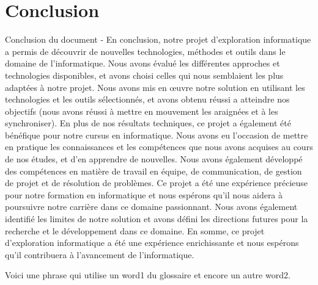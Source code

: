	\chapter{Conclusion}

Conclusion du document - En conclusion, notre projet d'exploration informatique a permis de découvrir de nouvelles technologies, 
méthodes et outils dans le domaine de l'informatique. Nous avons évalué les différentes approches et technologies disponibles, 
et avons choisi celles qui nous semblaient les plus adaptées à notre projet. Nous avons mis en œuvre notre solution en utilisant 
les technologies et les outils sélectionnés, et avons obtenu réussi a atteindre nos objectifs (nous avons réussi à mettre en mouvement 
les araignées et à les synchroniser). 
En plus de nos résultats techniques, ce projet a également été bénéfique pour notre cursus en informatique. 
Nous avons eu l'occasion de mettre en pratique les connaissances et les compétences que nous avons acquises au cours de nos études, 
et d'en apprendre de nouvelles. Nous avons également développé des compétences en matière de travail en équipe, de communication, 
de gestion de projet et de résolution de problèmes. Ce projet a été une expérience précieuse pour notre formation en informatique 
et nous espérons qu'il nous aidera à poursuivre notre carrière dans ce domaine passionnant. 
Nous avons également identifié les limites de notre solution et avons défini les directions futures pour la recherche et le 
développement dans ce domaine. En somme, ce projet d'exploration informatique a été une expérience enrichissante et nous espérons 
qu'il contribuera à l'avancement de l'informatique. 


Voici une phrase qui utilise un \gls{word1} du glossaire et encore un autre \gls{word2}.